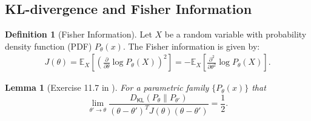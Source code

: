 \documentclass[11pt]{article}
\theoremstyle{plain}
\newtheorem{lemma}[theorem]{Lemma}
\theoremstyle{definition}
\newtheorem{definition}[theorem]{Definition}
\newcommand{\DKL}{D_{\mathsf{KL}}}
\begin{document}
\subsection{KL-divergence and Fisher Information}
\begin{definition}[Fisher Information]
Let $X$ be a random variable with probability density function (PDF) $P_{\theta}(x)$. The Fisher information is given by:
\begin{align*}
    J(\theta) = \mathbb{E}_X \left[ \left( \frac{\partial}{\partial \theta} \log P_{\theta}(X) \right)^2 \right]=- \mathbb{E}_X \left[  \frac{\partial^2}{\partial \theta^2} \log P_{\theta}(X) \right].
\end{align*}
\end{definition}
\begin{lemma}[Exercise 11.7 in \cite{cover2006elements}]
\label{lem:KL and MSE}
For a parametric family $\{P_\theta(x)\}$ that
\[
\lim_{\theta' \to \theta} \frac{\DKL(P_\theta \| P_{\theta'})}{(\theta - \theta')^TJ(\theta)(\theta-\theta')}  = \frac{1}{2}.
\]
\end{lemma}
\end{document}
